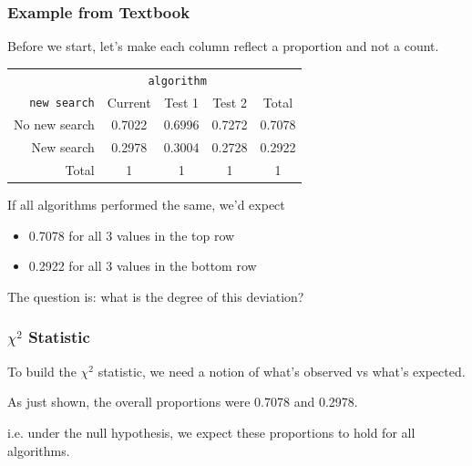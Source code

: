 \documentclass[slides]{beamer}
\newcommand{\blue}[1]{\textcolor{blue2}{#1}}
\begin{document}
\begin{frame}
\frametitle{Example from Textbook}

Before we start, let's make each column reflect a proportion and not a count. \pause
\begin{center}
  \begin{tabular}{r|ccc|c}
& \multicolumn{3}{c|}{{\tt algorithm}} & \\
       {\tt new search} & Current & Test 1 & Test 2 & Total \\ 
\hline
    No new search & 0.7022 & 0.6996 & 0.7272 & 0.7078 \\ 
    New search & 0.2978 & 0.3004 & 0.2728 & 0.2922 \\ 
\hline
    Total & 1 & 1 & 1 & 1 \\ 
  \end{tabular}
\end{center}

\pause
If all algorithms performed the same, we'd \blue{expect}
\begin{itemize}
\item \blue{0.7078} for all 3 values in the top row
\item \blue{0.2922} for all 3 values in the bottom row
\end{itemize}

\pause The question is: what is the degree of this deviation?
\end{frame}


\begin{frame}
\frametitle{$\chi^2$ Statistic}
To build the $\chi^2$ statistic, we need a notion of what's \blue{observed} vs what's \blue{expected}.

\vspace{0.5cm}

\pause As just shown, the overall proportions were 0.7078 and 0.2978.  

\vspace{0.5cm}

\pause i.e. under the null hypothesis, we \blue{expect} these proportions to hold for \blue{all} algorithms.  

\end{frame}
\end{document}
